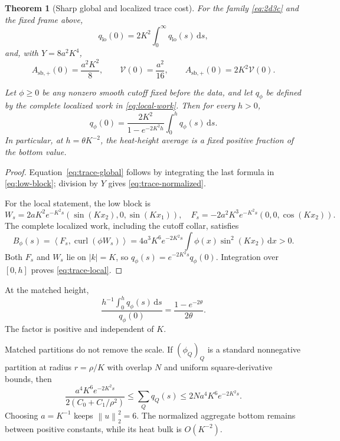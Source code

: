 \documentclass[11pt]{article}
\newtheorem{theorem}{Theorem}[section]
\theoremstyle{definition}
\newcommand{\curl}{\operatorname{curl}}
\newcommand{\ip}[2]{\left\langle #1,#2\right\rangle}
\newcommand{\norm}[1]{\left\lVert #1\right\rVert}
\newcommand{\abs}[1]{\left\lvert #1\right\rvert}
\newcommand{\dd}{\,\mathrm d}
\begin{document}
\begin{theorem}[Sharp global and localized trace cost]\label{thm:trace}
For the family \eqref{eq:2d3c} and the fixed frame above,
\begin{equation}\label{eq:trace-global}
 q_{\mathrm{lo}}(0)=2K^2\int_0^\infty q_{\mathrm{lo}}(s)\dd s,
\end{equation}
and, with \(Y=8a^2K^4\),
\begin{equation}\label{eq:trace-normalized}
 A_{\mathrm{sb},+}(0)=\frac{a^2K^2}{8},
 \qquad
 \mathcal V(0)=\frac{a^2}{16},
 \qquad
 A_{\mathrm{sb},+}(0)=2K^2\mathcal V(0).
\end{equation}

Let \(\phi\ge0\) be any nonzero smooth cutoff fixed before the data, and
let \(q_\phi\) be defined by the complete localized work in
\eqref{eq:local-work}.  Then for every \(h>0\),
\begin{equation}\label{eq:trace-local}
 q_\phi(0)=\frac{2K^2}{1-e^{-2K^2h}}
 \int_0^h q_\phi(s)\dd s.
\end{equation}
In particular, at \(h=\theta K^{-2}\), the heat-height average is a fixed
positive fraction of the bottom value.
\end{theorem}

\begin{proof}
Equation~\eqref{eq:trace-global} follows by integrating the last formula in
\eqref{eq:low-block}; division by \(Y\) gives
\eqref{eq:trace-normalized}.

For the local statement, the low block is
\[
 W_s=2aK^2e^{-K^2s}(\sin(Kx_2),0,\sin(Kx_1)),
 \quad
 F_s=-2a^2K^3e^{-K^2s}(0,0,\cos(Kx_2)).
\]
The complete localized work, including the cutoff collar, satisfies
\[
 B_\phi(s)=\ip{F_s}{\curl(\phi W_s)}
 =4a^3K^6e^{-2K^2s}
   \int\phi(x)\sin^2(Kx_2)\dd x>0.
\]
Both \(F_s\) and \(W_s\) lie on \(\abs{k}=K\), so
\(q_\phi(s)=e^{-2K^2s}q_\phi(0)\).  Integration over \([0,h]\) proves
\eqref{eq:trace-local}.
\end{proof}

At the matched height,
\begin{equation}\label{eq:trace-fraction}
 \frac{h^{-1}\int_0^h q_\phi(s)\dd s}{q_\phi(0)}
 =\frac{1-e^{-2\theta}}{2\theta}.
\end{equation}
The factor is positive and independent of \(K\).

Matched partitions do not remove the scale.  If
\((\phi_Q)_Q\) is a standard nonnegative partition at radius
\(r=\rho/K\) with overlap \(N\) and uniform square-derivative bounds, then
\begin{equation}\label{eq:partition-two-sided}
 \frac{a^4K^6e^{-2K^2s}}
 {2(C_0+C_1/\rho^2)}
 \le\sum_Qq_Q(s)
 \le2Na^4K^6e^{-2K^2s}.
\end{equation}
Choosing \(a=K^{-1}\) keeps \(\norm{u}_2^2=6\).  The normalized aggregate
bottom remains between positive constants, while its heat bulk is
\(O(K^{-2})\).
\end{document}
